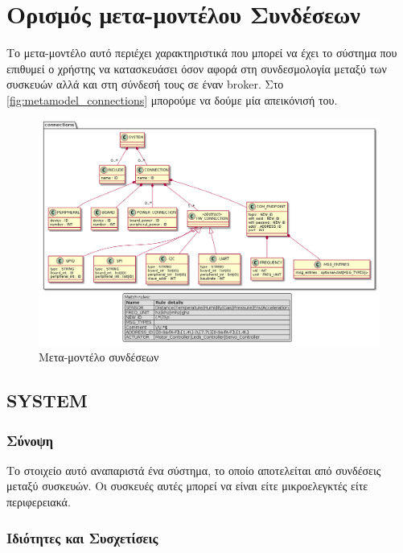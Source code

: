 \section{Ορισμός μετα-μοντέλου Συνδέσεων}
\label{sec:metamodel_connections}

Το μετα-μοντέλο αυτό περιέχει χαρακτηριστικά που μπορεί να έχει το σύστημα που επιθυμεί ο χρήστης να κατασκευάσει όσον αφορά στη συνδεσμολογία μεταξύ των συσκευών αλλά και στη σύνδεσή τους σε έναν broker. Στο \autoref{fig:metamodel_connections} μπορούμε να δούμε μία απεικόνισή του.

\begin{figure}[!ht]
	\centering
	\includegraphics[width=1.0\textwidth]{./images/chapter5/metamodel_connections.png}
	\caption{Μετα-μοντέλο συνδέσεων}
	\label{fig:metamodel_connections}
\end{figure}

\subsection{SYSTEM}
\label{subsec:system}

\subsubsection*{Σύνοψη}

\noindent Το στοιχείο αυτό αναπαριστά ένα σύστημα, το οποίο αποτελείται από συνδέσεις μεταξύ συσκευών. Οι συσκευές αυτές μπορεί να είναι είτε μικροελεγκτές είτε περιφερειακά. 

\subsubsection*{Ιδιότητες και Συσχετίσεις}

